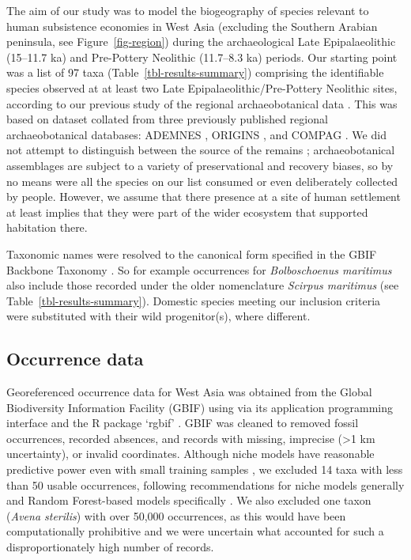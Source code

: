 \documentclass[
  authoryear,
  preprint]{elsarticle}
\begin{document}
The aim of our study was to model the biogeography of species relevant
to human subsistence economies in West Asia (excluding the Southern
Arabian peninsula, see Figure~\ref{fig-region}) during the
archaeological Late Epipalaeolithic (15--11.7 ka) and Pre-Pottery
Neolithic (11.7--8.3 ka) periods. Our starting point was a list of 97
taxa (Table~\ref{tbl-results-summary}) comprising the identifiable
species observed at at least two Late Epipalaeolithic/Pre-Pottery
Neolithic sites, according to our previous study of the regional
archaeobotanical data \citep{ArranzOtaeguiRoe2023}. This was based on
dataset collated from three previously published regional
archaeobotanical databases: ADEMNES \citep{ADEMNES}, ORIGINS
\citep{ORIGINS}, and COMPAG
\citetext{\citealp{LucasFuller2018}; \citealp{FullerEtAl2018}; \citealp[based
on][]{ColledgeEtAl2004}; \citealp{ShennanConolly2007}}. We did not
attempt to distinguish between the source of the remains
\citep[cf.][]{WallaceEtAl2018}; archaeobotanical assemblages are subject
to a variety of preservational and recovery biases, so by no means were
all the species on our list consumed or even deliberately collected by
people. However, we assume that there presence at a site of human
settlement at least implies that they were part of the wider ecosystem
that supported habitation there.

Taxonomic names were resolved to the canonical form specified in the
GBIF Backbone Taxonomy \citep{GBIFSecretariat2023}. So for example
occurrences for \emph{Bolboschoenus maritimus} also include those
recorded under the older nomenclature \emph{Scirpus maritimus} (see
Table~\ref{tbl-results-summary}). Domestic species meeting our inclusion
criteria were substituted with their wild progenitor(s), where
different.

\subsection{Occurrence data}\label{occurrence-data}

Georeferenced occurrence data for West Asia was obtained from the Global
Biodiversity Information Facility (GBIF) using via its application
programming interface and the R package `rgbif'
\citep{ChamberlainBoettiger2017, rgbif}. GBIF was cleaned to removed
fossil occurrences, recorded absences, and records with missing,
imprecise (\textgreater1 km uncertainty), or invalid coordinates.
Although niche models have reasonable predictive power even with small
training samples
\citep{StockwellPeterson2002, HernandezEtAl2006, WiszEtAl2008}, we
excluded 14 taxa with less than 50 usable occurrences, following
recommendations for niche models generally and Random Forest-based
models specifically \citep{StockwellPeterson2002, LuanEtAl2020}. We also
excluded one taxon (\emph{Avena sterilis}) with over 50,000 occurrences,
as this would have been computationally prohibitive and we were
uncertain what accounted for such a disproportionately high number of
records.
\end{document}

